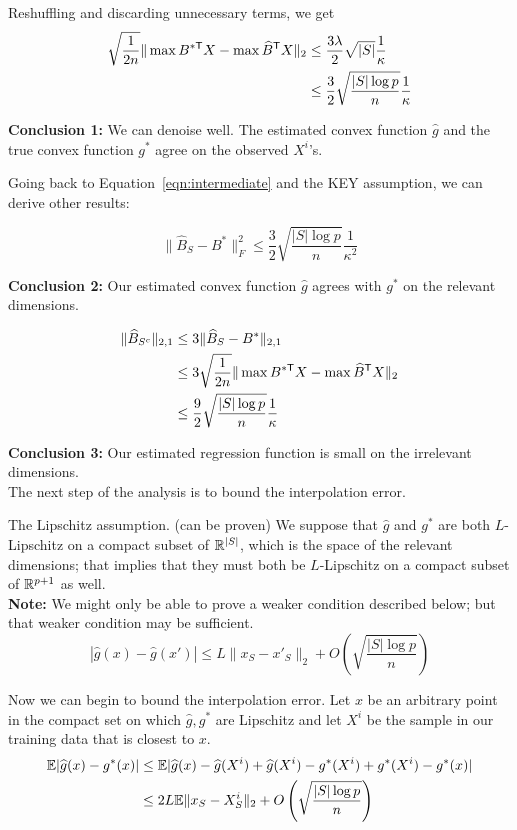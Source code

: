 \documentclass{article}
\begin{document}
Reshuffling and discarding unnecessary terms, we get
\begin{align*}
\sqrt{\frac{1}{2n}} \| \max B^{* \mathsf{T}} X - \max \widehat{B}^{\mathsf{T}} X  \|_2  &\leq \frac{3\lambda}{2} \sqrt{|S|}  \frac{1}{\kappa} \\
					&\leq \frac{3}{2} \sqrt{ \frac{ |S| \log p}{n}} \frac{1}{\kappa}
\end{align*}

\textbf{Conclusion 1: } We can denoise well. The estimated convex function $\hat{g}$ and the true convex function $g^*$ agree on the observed $X^i$'s. 

Going back to Equation~\ref{eqn:intermediate} and the KEY assumption, we can derive other results:

\[
\| \hat{B}_S - B^* \|_F^2 \leq \frac{3}{2} \sqrt{\frac{|S| \log p}{n} } \frac{1}{\kappa^2}
\]

\textbf{Conclusion 2: } Our estimated convex function $\hat{g}$ agrees with $g^*$ on the relevant dimensions.

\begin{align*}
\| \widehat{B}_{S^c} \|_{2,1} & \leq 3 \| \widehat{B}_S - B^* \|_{2,1} \\
				&\leq 3 \sqrt{\frac{1}{2n}} \| \max B^{*\mathsf{T}} X - \max \widehat{B}^{\mathsf{T}} X \|_2\\
				&\leq \frac{9}{2} \sqrt{\frac{|S|\log p}{n}} \frac{1}{\kappa}
\end{align*}

\textbf{Conclusion 3: } Our estimated regression function is small on the irrelevant dimensions.\\

The next step of the analysis is to bound the interpolation error. 

\begin{framed}
The Lipschitz assumption. (can be proven) We suppose that $\hat{g}$ and $g^*$ are both $L$-Lipschitz on a compact subset of $\mathbb{R}^{|S|}$, which is the space of the relevant dimensions; that implies that they must both be $L$-Lipschitz on a compact subset of $\mathbb{R}^{p+1}$ as well.\\

\textbf{Note: } We might only be able to prove a weaker condition described below; but that weaker condition may be sufficient. 
\[
|\hat{g}(x) - \hat{g}(x') | \leq L \| x _S - x'_S \|_2 + O\left( \sqrt{\frac{|S| \log p}{n}} \right)
\]
\end{framed}

Now we can begin to bound the interpolation error. Let $x$ be an arbitrary point in the compact set on which $\hat{g}, g^*$ are Lipschitz and let $X^i$ be the sample in our training data that is closest to $x$.
\begin{align*}
\mathbb{E}|\widehat{g}(x) - g^*(x) | & \leq \mathbb{E}| \widehat{g}(x) - \widehat{g}(X^i) + \widehat{g}(X^i) - g^*(X^i) + g^*(X^i) - g^*(x) | \\
		&\leq 2L\mathbb{E}\| x_S - X^i_S \|_2 + O\left( \sqrt{\frac{|S|\log p}{n} } \right)
\end{align*}
\end{document}
